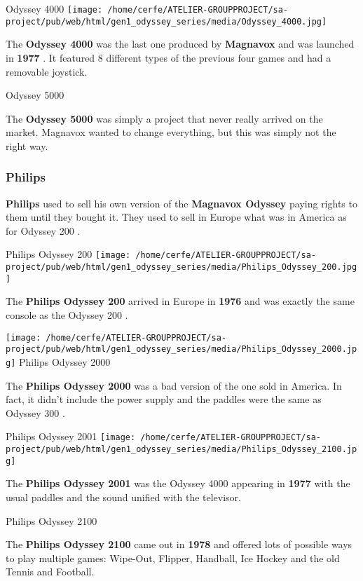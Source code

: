\documentclass[a4paper,10pt]{book}
\begin{document}
 
 Odyssey 4000 
 \texttt{[image: /home/cerfe/ATELIER-GROUPPROJECT/sa-project/pub/web/html/gen1\_odyssey\_series/media/Odyssey\_4000.jpg]}
 
          The  \textbf{Odyssey 4000 }  was the last one produced by  \textbf{Magnavox }  and was launched in
           \textbf{1977 } . It featured 8 different types of the previous four games and had a removable joystick.
         
 Odyssey 5000 
 
          The  \textbf{Odyssey 5000 }  was simply a project that never really arrived on the market. Magnavox wanted
          to change everything, but this was simply not the right way.
         
 
 \subsubsection{Philips }
 
 \textbf{Philips }  used to sell his own version of the  \textbf{Magnavox Odyssey }  paying rights
          to them until they bought it. They used to sell in Europe what was in America as for  Odyssey 200 .
         
 Philips Odyssey 200 
 \texttt{[image: /home/cerfe/ATELIER-GROUPPROJECT/sa-project/pub/web/html/gen1\_odyssey\_series/media/Philips\_Odyssey\_200.jpg]}
 
          The  \textbf{Philips Odyssey 200 }  arrived in Europe in  \textbf{1976 }  and was exactly the same console
          as the  Odyssey 200 .
         
 \texttt{[image: /home/cerfe/ATELIER-GROUPPROJECT/sa-project/pub/web/html/gen1\_odyssey\_series/media/Philips\_Odyssey\_2000.jpg]}
 Philips Odyssey 2000 
 
          The  \textbf{Philips Odyssey 2000 }  was a bad version of the one sold in America. In fact, it didn't
          include the power supply and the paddles were the same as  Odyssey 300 .
         
 
 Philips Odyssey 2001 
 \texttt{[image: /home/cerfe/ATELIER-GROUPPROJECT/sa-project/pub/web/html/gen1\_odyssey\_series/media/Philips\_Odyssey\_2100.jpg]}
 
          The  \textbf{Philips Odyssey 2001 }  was the  Odyssey 4000  appearing in  \textbf{1977 }  with
          the usual paddles and the sound unified with the televisor.
         
 Philips Odyssey 2100 
 
          The  \textbf{Philips Odyssey 2100 }  came out in  \textbf{1978 }  and offered lots of possible ways to play
          multiple games: Wipe-Out, Flipper, Handball, Ice Hockey and the old Tennis and Football.
         
\end{document}
